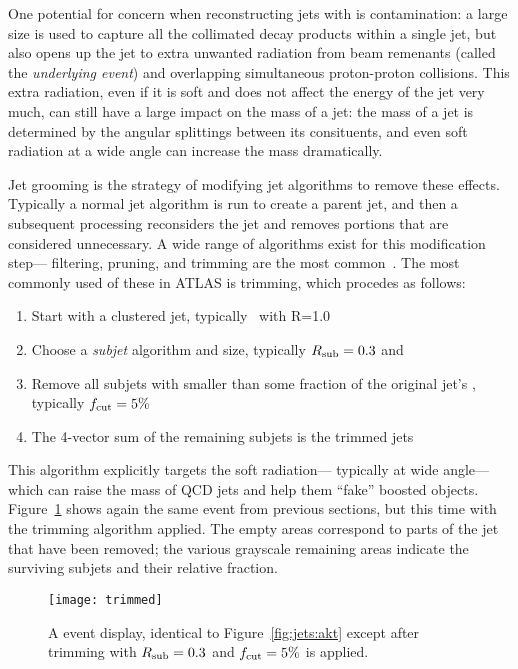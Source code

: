 One potential for concern when reconstructing jets with \largeR is contamination: a large size is used to capture all the collimated decay products within a single jet, but also opens up the jet to extra unwanted radiation from beam remenants (called the \textit{underlying event}) and overlapping simultaneous proton-proton collisions. This extra radiation, even if it is soft and does not affect the energy of the jet very much, can still have a large impact on the mass of a jet: the mass of a jet is determined by the angular splittings between its consituents, and even soft radiation at a wide angle can increase the mass dramatically.

Jet grooming is the strategy of modifying jet algorithms to remove these effects. Typically a normal jet algorithm is run to create a parent jet, and then a subsequent processing reconsiders the jet and removes portions that are considered unnecessary. A wide range of algorithms exist for this modification step--- filtering, pruning, and trimming are the most common~\cite{BDRS,Krohn:2009th,Ellis:2009me}. The most commonly used of these in ATLAS is trimming, which procedes as follows:
%
\begin{enumerate}
\item Start with a clustered \largeR jet, typically \antikt\ with R=1.0
\item Choose a \textit{subjet} algorithm and size, typically $R_{\rm sub} = 0.3$ and \kt
\item Remove all subjets with \pt smaller than some fraction \fcut of the original jet's \pt, typically $f_{\rm cut}  = 5\%$
\item The 4-vector sum of the remaining subjets is the trimmed jets
\end{enumerate}
%
This algorithm explicitly targets the soft radiation--- typically at wide angle--- which can raise the mass of QCD jets and help them ``fake'' boosted objects. Figure~\ref{fig:jets:trimmed} shows again the same event from previous sections, but this time with the trimming algorithm applied. The empty areas correspond to parts of the jet that have been removed; the various grayscale remaining areas indicate the surviving subjets and their relative \pt fraction. 



\begin{figure}
\centering
\texttt{[image: trimmed]}
\caption{A event display, identical to Figure~\ref{fig:jets:akt} except after trimming with $R_{\rm sub} = 0.3$ and $f_{\rm cut} = 5\%$ is applied.}
\label{fig:jets:trimmed}
\end{figure}

